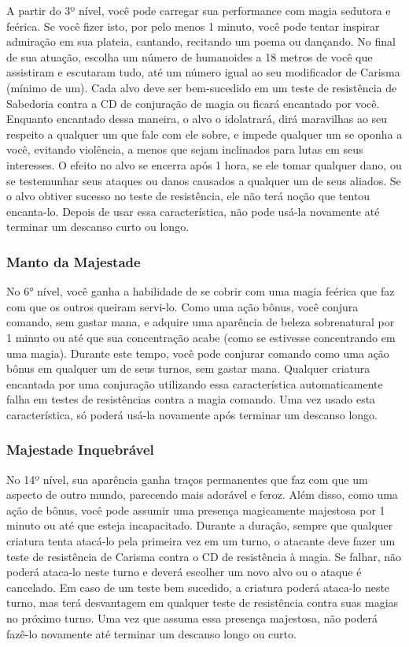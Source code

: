 \documentclass{RPG_Adventure}[2021/10/20]
\begin{document}
A partir do 3º nível, você pode carregar sua performance com magia sedutora e
feérica.
Se você fizer isto, por pelo menos 1 minuto, você pode tentar inspirar admiração
em sua plateia, cantando, recitando um poema ou dançando. No final de sua
atuação, escolha um número de humanoides a 18 metros de você que assistiram e
escutaram tudo, até um número igual ao seu modificador de Carisma (mínimo de
um).
Cada alvo deve ser bem-sucedido em um teste de resistência de Sabedoria contra
a CD de conjuração de magia ou ficará encantado por você. Enquanto encantado
dessa maneira, o alvo o idolatrará, dirá maravilhas ao seu respeito a qualquer
um que fale com ele sobre, e impede qualquer um se oponha a você, evitando
violência, a menos que sejam inclinados para lutas em seus interesses. O efeito
no alvo se encerra após 1 hora, se ele tomar qualquer dano, ou se testemunhar
seus ataques ou danos causados a qualquer um de seus aliados.
Se o alvo obtiver sucesso no teste de resistência, ele não terá noção que tentou
encanta-lo.
Depois de usar essa característica, não pode usá-la novamente até terminar um
descanso curto ou longo.

\subsubsection{Manto da Majestade}%

No 6° nível, você ganha a habilidade de se cobrir com uma magia feérica que faz
com que os outros queiram servi-lo. Como uma ação bônus, você conjura comando,
sem gastar mana, e adquire uma aparência de beleza sobrenatural por 1 minuto ou
até que sua concentração acabe (como se estivesse concentrando em uma magia).
Durante este tempo, você pode conjurar comando como uma ação bônus em qualquer
um de seus turnos, sem gastar mana.  Qualquer criatura encantada por uma
conjuração utilizando essa característica automaticamente falha em testes de
resistências contra a magia comando. Uma vez usado esta característica, só
poderá usá-la novamente após terminar um descanso longo.

\subsubsection{Majestade Inquebrável}%

No 14º nível, sua aparência ganha traços permanentes que faz com que um aspecto
de outro mundo, parecendo mais adorável e feroz.
Além disso, como uma ação de bônus, você pode assumir uma presença magicamente
majestosa por 1 minuto ou até que esteja incapacitado. Durante a duração, sempre
que qualquer criatura tenta atacá-lo pela primeira vez em um turno, o atacante
deve fazer um teste de resistência de Carisma contra o CD de resistência à
magia. Se falhar, não poderá ataca-lo neste turno e deverá escolher um novo alvo
ou o ataque é cancelado. Em caso de um teste bem sucedido, a criatura poderá
ataca-lo neste turno, mas terá desvantagem em qualquer teste de resistência
contra suas magias no próximo turno.
Uma vez que assuma essa presença majestosa, não poderá fazê-lo novamente até
terminar um descanso longo ou curto.
\end{document}
